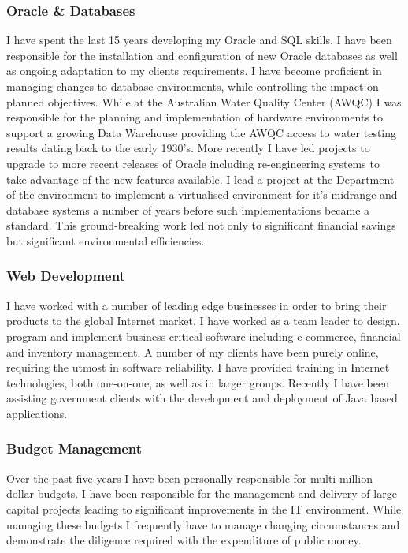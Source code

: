 \documentclass[]{friggeri-cv} %
\begin{document}
\subsubsection*{Oracle \& Databases}
I have spent the last 15 years developing my Oracle and SQL skills. I have been responsible for the installation and configuration of new Oracle databases as well as ongoing adaptation to my clients requirements. I have become proficient in managing changes to database environments, while controlling the impact on planned objectives. While at the Australian Water Quality Center (AWQC) I was responsible for the planning and implementation of hardware environments to support a growing Data Warehouse providing the AWQC access to water testing results dating back to the early 1930’s. More recently I have led projects to upgrade to more recent releases of Oracle including re-engineering systems to take advantage of the new features available. I lead a project at the Department of the environment to implement a virtualised environment for it's midrange and database systems a number of years before such implementations became a standard. This ground-breaking work led not only to significant financial savings but significant environmental efficiencies.

\subsubsection*{Web Development}
I have worked with a number of leading edge businesses in order to bring their products to the global Internet market. I have worked as a team leader to design, program and implement business critical software including e-commerce, financial and inventory management. A number of my clients have been purely online, requiring the utmost in software reliability. I have provided training in Internet technologies, both one-on-one, as well as in larger groups. Recently I have been assisting government clients with the development and deployment of Java based applications.

\subsubsection*{Budget Management}
Over the past five years I have been personally responsible for multi-million dollar budgets. I have been responsible for the management and delivery of large capital projects leading to significant improvements in the IT environment. While managing these budgets I frequently have to manage changing circumstances and demonstrate the diligence required with the expenditure of public money.
\end{document}
